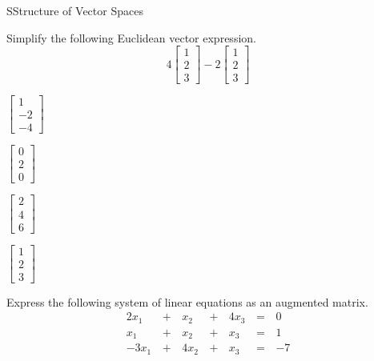 \documentclass{article}[12pt]
\begin{document}
\begin{module}{S}{Structure of Vector Spaces}

  \begin{readinessAssuranceTest}
  \item Simplify the following Euclidean vector expression.
  $$4
    \begin{bmatrix}
      1 \\ 2 \\ 3
    \end{bmatrix}-
    2
    \begin{bmatrix}
      1 \\ 2 \\ 3
    \end{bmatrix}$$


  \begin{multicols}{4}
  \begin{readinessAssuranceTestChoices}
  \item \(
          \begin{bmatrix}
            1 \\ -2 \\ -4
          \end{bmatrix}
        \)
  \item \(
          \begin{bmatrix}
            0 \\ 2 \\ 0
          \end{bmatrix}
        \)
  \item \(
          \begin{bmatrix}
            2 \\ 4 \\ 6
          \end{bmatrix}
        \) %
  \item \(
          \begin{bmatrix}
            1 \\ 2 \\ 3
          \end{bmatrix}
        \)

  \end{readinessAssuranceTestChoices}
  \end{multicols}




  \item Express the following system of linear equations as an augmented matrix.
  \begin{alignat*}{4}
    2x_1 &\,+\,& x_2 &\,+\,& 4x_3 &\,=\,& 0 \\
     x_1 &\,+\,& x_2 &\,+\,&  x_3 &\,=\,& 1 \\
   -3x_1 &\,+\,& 4x_2 &\,+\,& x_3 &\,=\,& -7 \\
  \end{alignat*}


\end{readinessAssuranceTest}
\end{module}
\end{document}
